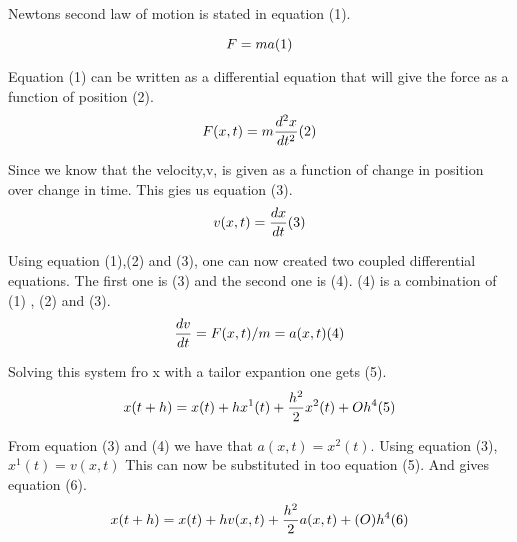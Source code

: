 \documentclass{article}
\begin{document}
    Newtons second law of motion is stated in equation (1).

    \begin{equation} \label{eq:n2l}
        F = ma  (1)\\
    \end{equation}


    Equation (1) can be written as a differential equation that will give the force as a function of position (2).\\

    \begin{equation}    \label{eq:diffn2l}
        F(x,t) = m\frac{d^{2}x}{dt^{2}} (2)\\
    \end{equation}

    Since we know that the velocity,v, is given as a function of change in position over change in time. This gies us equation (3).\\

    \begin{equation}    \label{eq:diffvelocity}
        v(x,t) = \frac{dx}{dt} (3) \\
    \end{equation}

    Using equation (1),(2) and (3), one can now created two coupled differential equations. The first one is (3) and the second one is (4). (4) is a combination of (1) , (2) and (3). \\

    \begin{equation}    \label{eq:acceleration}
        \frac{dv}{dt} = F(x,t)/m = a(x,t) (4) \\
    \end{equation}

    Solving this system fro x with a tailor expantion one gets (5).\\

    \begin{equation}    \label{eq:positiontaylor}
        x(t+h) = x(t) + hx^{1}(t) + \frac{h^{2}}{2} x^{2}(t) + Oh^{4} (5)\\
    \end{equation}

    From equation (3) and (4) we have that $a(x,t) = x^{2}(t)$. Using equation (3), $x^{1}(t) = v(x,t)$ This can now be substituted in too equation (5). And gives equation (6).  \\

    \begin{equation}    \label{eq:positionfinal}
        x(t+h) = x(t) + h v(x,t) + \frac{h^{2}}{2} a(x,t) + (O)h^{4} (6) \\
    \end{equation}
\end{document}
